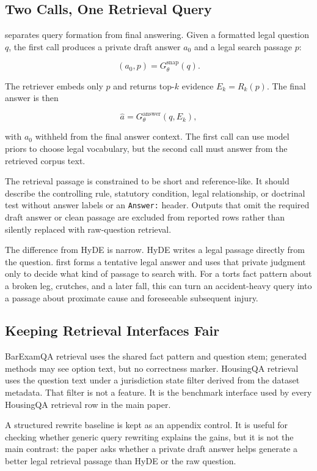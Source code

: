\subsection{Two Calls, One Retrieval Query}\label{sec:method:snaphyre}

\hyre{} separates query formation from final answering. Given a formatted legal
question $q$, the first call produces a private draft answer $a_0$ and a legal
search passage $p$:

\begin{equation}
(a_0, p) = G_{\theta}^{\mathrm{snap}}(q).
\end{equation}

The retriever embeds only $p$ and returns top-$k$ evidence $E_k = R_k(p)$. The
final answer is then

\begin{equation}
\hat{a} = G_{\theta}^{\mathrm{answer}}(q, E_k),
\end{equation}

with $a_0$ withheld from the final answer context. The first call can use model
priors to choose legal vocabulary, but the second call must answer from the
retrieved corpus text.

The retrieval passage is constrained to be short and reference-like. It should
describe the controlling rule, statutory condition, legal relationship, or
doctrinal test without answer labels or an \texttt{Answer:} header. Outputs
that omit the required draft answer or clean passage are excluded from reported
rows rather than silently replaced with raw-question retrieval.

The difference from HyDE is narrow. HyDE writes a legal passage directly from
the question. \hyre{} first forms a tentative legal answer and uses that private
judgment only to decide what kind of passage to search with. For a torts fact
pattern about a broken leg, crutches, and a later fall, this can turn an
accident-heavy query into a passage about proximate cause and foreseeable
subsequent injury.

\subsection{Keeping Retrieval Interfaces Fair}

BarExamQA retrieval uses the shared fact pattern and question stem; generated
methods may see option text, but no correctness marker. HousingQA retrieval
uses the question text under a jurisdiction state filter derived from the
dataset metadata. That filter is not a \hyre{} feature. It is the benchmark
interface used by every HousingQA retrieval row in the main paper.

A structured rewrite baseline is kept as an appendix control. It is useful for
checking whether generic query rewriting explains the gains, but it is not the
main contrast: the paper asks whether a private draft answer helps generate a
better legal retrieval passage than HyDE or the raw question.

